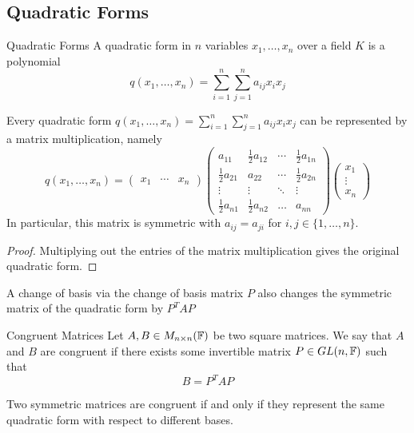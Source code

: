 \documentclass[a4paper]{article}
\begin{document}
\subsection{Quadratic Forms}
\begin{defn}{Quadratic Forms}{} A quadratic form in $n$ variables $x_1,\dots,x_n$ over a field $K$ is a polynomial $$q(x_1,\dots,x_n)=\sum_{i=1}^n\sum_{j=1}^na_{ij}x_ix_j$$
\end{defn}

\begin{prp}{}{} Every quadratic form $q(x_1,\dots,x_n)=\sum_{i=1}^n\sum_{j=1}^na_{ij}x_ix_j$ can be represented by a matrix multiplication, namely $$q(x_1,\dots,x_n)=\begin{pmatrix}x_1 & \cdots & x_n\end{pmatrix}\begin{pmatrix}a_{11} & \frac{1}{2}a_{12} & \cdots & \frac{1}{2}a_{1n}\\
\frac{1}{2}a_{21} & a_{22} & \cdots & \frac{1}{2}a_{2n}\\
\vdots & \vdots & \ddots & \vdots\\
\frac{1}{2}a_{n1} & \frac{1}{2}a_{n2} & \dots & a_{nn}
\end{pmatrix}\begin{pmatrix}x_1 \\ \vdots \\ x_n\end{pmatrix}$$ In particular, this matrix is symmetric with $a_{ij}=a_{ji}$ for $i,j\in\{1,\dots,n\}$. 
\begin{proof}
Multiplying out the entries of the matrix multiplication gives the original quadratic form. 
\end{proof}
\end{prp}

\begin{prp}{}{} A change of basis via the change of basis matrix $P$ also changes the symmetric matrix of the quadratic form by $P^TAP$
\end{prp}

\begin{defn}{Congruent Matrices}{} Let $A,B\in M_{n\times n}(\mathbb{F})$ be two square matrices. We say that $A$ and $B$ are congruent if there exists some invertible matrix $P\in GL(n,\mathbb{F})$ such that $$B=P^TAP$$
\end{defn}

\begin{prp}{}{} Two symmetric matrices are congruent if and only if they represent the same quadratic form with respect to different bases. 
\end{prp}
\end{document}
